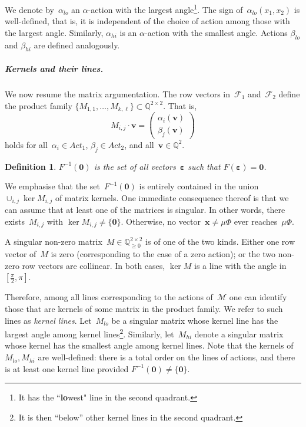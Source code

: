 \documentclass[preprint,12pt]{elsarticle}
\theoremstyle{plain}
\newtheorem{definition}[theorem]{Definition}
\theoremstyle{definition}
\theoremstyle{remark}
\theoremstyle{claimstyle}
\newcommand{\mdp}{\mathcal{M}}
\newcommand{\QQ}{\mathbb{Q}}
\newcommand{\eps}{\bm{\varepsilon}}
\begin{document}
We denote by~$\alpha_{lo}$ an $\alpha$-action with the largest angle\footnote{It has the ``{\bf lo}west" line in the second quadrant.}.
The sign of~$\alpha_{lo}(x_1, x_2)$ is well-defined, that is,
it is independent of the choice of action
among those with the largest angle.
Similarly, $\alpha_{hi}$ is an $\alpha$-action with the smallest angle. 
Actions $\beta_{lo}$ and $\beta_{hi}$ are defined analogously.

\subparagraph{Kernels and their lines.} We now resume the matrix argumentation.
The row vectors in~$\mathcal{F}_1$ and~$\mathcal{F}_2$ define the product family $\{M_{1,1}, \dots, M_{k,\ell}\} \subset \QQ^{2 \times 2}$. That is,
\[%
M_{i,j} \cdot \bm{v} = 
\begin{pmatrix}
	\alpha_i(\bm{v}) \\	\beta_j(\bm{v})
\end{pmatrix}
\]
holds for all~$\alpha_i \in Act_1$, $\beta_j \in Act_2$, and all~$\bm{v} \in \QQ^2$.

\begin{definition}
	$F^{-1}(\bm{0})$ is the set of all vectors~$\eps$ such that $F(\eps) = \bm{0}$.
\end{definition}
We emphasise that the set~$F^{-1}(\bm{0})$ is entirely contained in the union $\cup_{i,j} \ker M_{i,j}$ of matrix kernels.
One immediate consequence thereof is that we can assume that at least one of the
matrices is singular. 
In other words, there exists~$M_{i,j}$ with
$\ker M_{i,j} \neq \{\bm{0}\}$.
Otherwise, no vector~$\bm{x} \neq \mu\Phi$ ever reaches~$\mu\Phi$.

A singular non-zero matrix~$M \in \QQ_{\geq 0}^{2\times 2}$ is of one of the two kinds.
Either one row vector of~$M$ is zero (corresponding to the case of a zero action);
or the two non-zero row vectors are collinear.
In both cases, $\ker M$ is a line with the angle in $[\frac{\pi}{2}, \pi]$.

Therefore, among all lines corresponding to the actions of~$\mdp$ 
one can identify those that are kernels of some matrix in the product family.
We refer to such lines as \emph{kernel lines}.
Let~$M_{lo}$ be a singular matrix whose kernel 
line has the largest angle among kernel lines\footnote{It is then ``below'' other kernel lines in the second quadrant.}. 
Similarly, let~$M_{hi}$ denote a singular matrix whose kernel has the smallest angle among kernel lines.
Note that the kernels of~$M_{lo}, M_{hi}$ are well-defined: there is a total order on the lines of actions, 
and there is at least one kernel line provided $F^{-1}(\bm{0}) \neq \{\bm{0}\}$.
\end{document}
